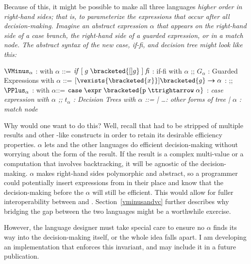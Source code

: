\documentclass[manuscript,screen,review, 12pt, nonacm]{acmart}
\begin{document}
        Because of this, it might be possible to make all three languages
        \it{higher order} in right-hand sides; that is, to parameterize the
        expressions that occur \it{after} all decision-making. Imagine an
        abstract expression $\alpha$ that appears on the right-hand side of a
        \it{case} branch, the right-hand side of a guarded expression, or in a
        \it{match} node. The abstract syntax of the new \it{case}, \it{if-fi},
        and decision tree might look like this: 
        \begin{center}
            \begin{bnf}
                $\VMinus_{\alpha}$ : \VMinus with $\alpha$ ::=
                $\mathit{if}\; \mathit{[}\; g\; \bracketed{[] g}\; \mathit{]}\; \mathit{fi}$ : if-fi with $\alpha$
                ;;
                $G_{\alpha}$ : Guarded Expressions with $\alpha$ ::=
                $[\vexists{\bracketed{x}}] \bracketed{g} \boldsymbol{\rightarrow}\alpha$ : 
                ;;
                $\PPlus_{\alpha}$ : \PPlus with $\alpha$::=
                $\tt{case}\; \expr\; \bracketed{p\; \ttrightarrow\; \alpha}$ : \it{case} expression with $\alpha$ 
                ;;
                $t_{\alpha}$ : Decision Trees with $\alpha$ ::= 
                | \dots : other forms of tree 
                | $\alpha$ : match node 
            \end{bnf}
        \end{center}

        Why would one want to do this? Well, recall that \VMinus had to be
        stripped of multiple results and other \VC-like constructs in order to
        retain its desirable efficiency properties. $\alpha$ lets \VMinus and
        the other languages do efficient decision-making without worrying about
        the form of the result. If the result is a complex multi-value or a
        computation that involves backtracking, it will be agnostic of the
        decision-making. $\alpha$ makes right-hand sides polymorphic and
        abstract, so a programmer could potentially insert expressions from \VC
        in their place and know that the decision-making before the $\alpha$
        will still be efficient. This would allow for fuller interoperability
        between \VC and \VMinus. Section~\ref{vminusandvc} further describes
        why bridging the gap between the two languages might be a worthwhile
        exercise. 

        However, the language designer must take special care to ensure no
        $\alpha$ finds its way into the decision-making itself, or the whole
        idea falls apart. I am developing an implementation that enforces this
        invariant, and may include it in a future publication. 
        
\end{document}
